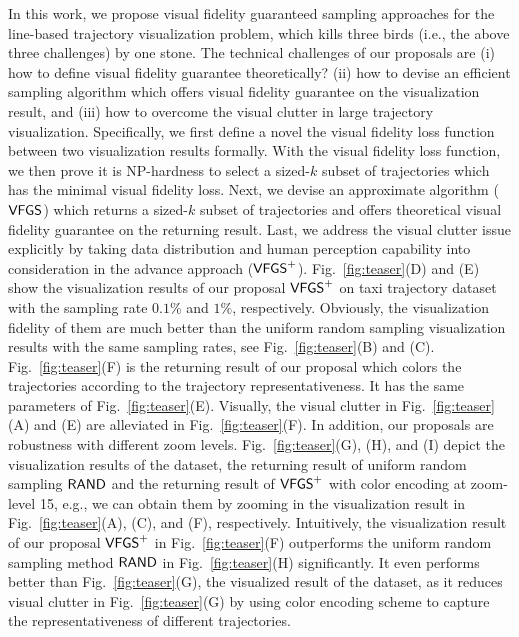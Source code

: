 In this work, we propose visual fidelity guaranteed sampling approaches for the line-based trajectory visualization problem,
which kills three birds (i.e., the above three challenges) by one stone.
The technical challenges of our proposals are
(i) how to define visual fidelity guarantee theoretically?
(ii) how to devise an efficient sampling algorithm which offers visual fidelity guarantee on the visualization result,
and (iii) how to overcome the visual clutter in large trajectory visualization.
Specifically, we first define a novel the visual fidelity loss function between two visualization results formally.
With the visual fidelity loss function, we then prove it is NP-hardness to select a sized-$k$ subset of trajectories which has the minimal visual fidelity loss.
Next, we devise an approximate algorithm ($\mathsf{VFGS}$) which returns a sized-$k$ subset of trajectories and offers theoretical visual fidelity guarantee on the returning result.
Last, we address the visual clutter issue explicitly by taking data distribution and human perception capability into consideration in the advance approach ($\mathsf{VFGS}^{+}$).
Fig.~\ref{fig:teaser}(D) and (E) show the visualization results of our proposal $\mathsf{VFGS}^{+}{}$ on \pt{} taxi trajectory dataset with {the} sampling rate $0.1\%$ and $1\%$, respectively.
Obviously, the visualization fidelity of them are much better than the uniform random sampling visualization results with the same sampling rates, see Fig.~\ref{fig:teaser}(B) and (C).
Fig.~\ref{fig:teaser}(F) is the returning result of our proposal which colors the trajectories {according to the trajectory representativeness}.
It has the same parameters of Fig.~\ref{fig:teaser}(E).
Visually, the visual clutter in Fig.~\ref{fig:teaser}(A) and (E) are alleviated in Fig.~\ref{fig:teaser}(F).
In addition, our proposals are robustness with different zoom levels.
Fig.~\ref{fig:teaser}(G), (H), and (I) depict the visualization results of the \pt{} dataset, the returning result of uniform random sampling $\mathsf{RAND}$ and the returning result of $\mathsf{VFGS}^{+}$ with color encoding at zoom-level 15, e.g., we can obtain them by zooming in the visualization result in Fig.~\ref{fig:teaser}(A), (C), and (F), respectively.
Intuitively, the visualization result of our proposal $\mathsf{VFGS}^{+}$ in Fig.~\ref{fig:teaser}(F) outperforms the uniform random sampling method $\mathsf{RAND}$ in Fig.~\ref{fig:teaser}(H) significantly.
It even performs better than Fig.~\ref{fig:teaser}(G), the visualized result of the \pt{} dataset, as it reduces visual clutter in Fig.~\ref{fig:teaser}(G) by using color encoding scheme to capture the representativeness of different trajectories.

